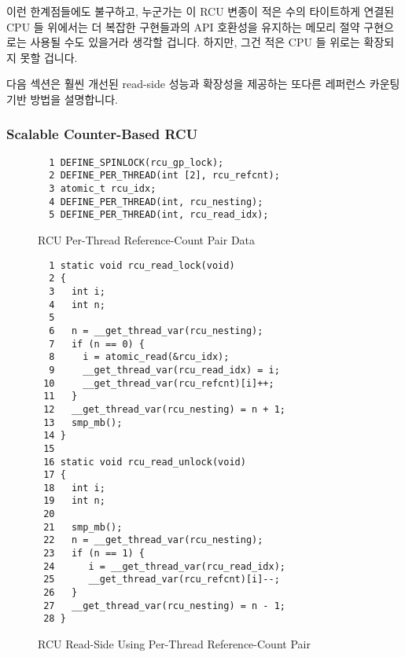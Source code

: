 이런 한계점들에도 불구하고, 누군가는 이 RCU 변종이 적은 수의 타이트하게 연결된
CPU 들 위에서는 더 복잡한 구현들과의 API 호환성을 유지하는 메모리 절약
구현으로는 사용될 수도 있을거라 생각할 겁니다.
하지만, 그건 적은 CPU 들 위로는 확장되지 못할 겁니다.

다음 섹션은 훨씬 개선된 read-side 성능과 확장성을 제공하는 또다른 레퍼런스
카운팅 기반 방법을 설명합니다.
\iffalse

Despite these shortcomings, one could imagine this variant
of RCU being used on small tightly coupled multiprocessors,
perhaps as a memory-conserving implementation that maintains
API compatibility with more complex implementations.
However, it would not likely scale well beyond a few CPUs.

The next section describes yet another variation on the reference-counting
scheme that provides greatly improved read-side performance and scalability.
\fi

\subsubsection{Scalable Counter-Based RCU}
\label{defer:Scalable Counter-Based RCU}

\begin{figure}[tbp]
{ \scriptsize
\begin{verbatim}
  1 DEFINE_SPINLOCK(rcu_gp_lock);
  2 DEFINE_PER_THREAD(int [2], rcu_refcnt);
  3 atomic_t rcu_idx;
  4 DEFINE_PER_THREAD(int, rcu_nesting);
  5 DEFINE_PER_THREAD(int, rcu_read_idx);
\end{verbatim}
}
\caption{RCU Per-Thread Reference-Count Pair Data}
\label{fig:defer:RCU Per-Thread Reference-Count Pair Data}
\end{figure}

\begin{figure}[tbp]
{ \scriptsize
\begin{verbatim}
  1 static void rcu_read_lock(void)
  2 {
  3   int i;
  4   int n;
  5
  6   n = __get_thread_var(rcu_nesting);
  7   if (n == 0) {
  8     i = atomic_read(&rcu_idx);
  9     __get_thread_var(rcu_read_idx) = i;
 10     __get_thread_var(rcu_refcnt)[i]++;
 11   }
 12   __get_thread_var(rcu_nesting) = n + 1;
 13   smp_mb();
 14 }
 15
 16 static void rcu_read_unlock(void)
 17 {
 18   int i;
 19   int n;
 20
 21   smp_mb();
 22   n = __get_thread_var(rcu_nesting);
 23   if (n == 1) {
 24      i = __get_thread_var(rcu_read_idx);
 25      __get_thread_var(rcu_refcnt)[i]--;
 26   }
 27   __get_thread_var(rcu_nesting) = n - 1;
 28 }
\end{verbatim}
}
\caption{RCU Read-Side Using Per-Thread Reference-Count Pair}
\label{fig:defer:RCU Read-Side Using Per-Thread Reference-Count Pair}
\end{figure}

